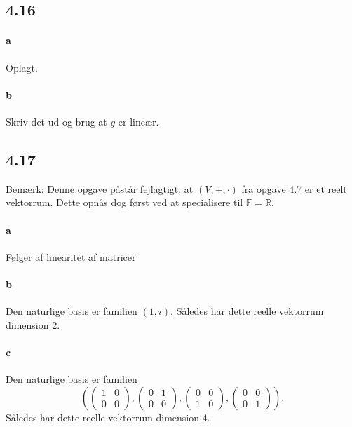 		\subsection{4.16}

			\paragraph{a} Oplagt.

			\paragraph{b} Skriv det ud og brug at $g$ er lineær.

		\subsection{4.17}
		    Bemærk: Denne opgave påstår fejlagtigt, at $(V, +, \cdot)$ fra opgave 4.7 er et reelt vektorrum. Dette opnås dog først ved at specialisere til $\mathbb{F} = \mathbb{R}$.

			\paragraph{a} Følger af linearitet af matricer

			\paragraph{b} Den naturlige basis er familien $(1, i)$. Således har dette reelle vektorrum dimension $2$.

			\paragraph{c} Den naturlige basis er familien
			\[
			\left(
			\begin{pmatrix} 1 & 0 \\ 0 & 0 \end{pmatrix},
			\begin{pmatrix} 0 & 1 \\ 0 & 0 \end{pmatrix},
			\begin{pmatrix} 0 & 0 \\ 1 & 0 \end{pmatrix},
			\begin{pmatrix} 0 & 0 \\ 0 & 1 \end{pmatrix}
			\right).
			\]
			Således har dette reelle vektorrum dimension $4$.


